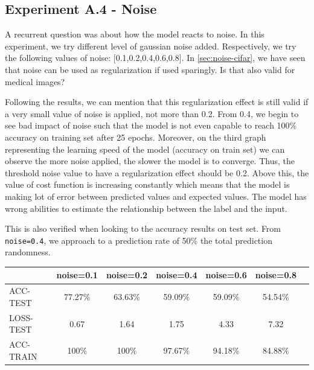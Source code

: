 \documentclass[11pt, openany]{report}
\theoremstyle{plain}
\theoremstyle{definition}
\theoremstyle{remark}
\begin{document}
\newpage
\subsection{Experiment A.4 - Noise} \label{sec:noise-allidb1}

A recurrent question was about how the model reacts to noise. In this experiment, we try different level of gaussian noise added. Respectively, we try the following values of noise: [0.1,0.2,0.4,0.6,0.8]. In \autoref{sec:noise-cifar}, we have seen that noise can be used as regularization if used sparingly. Is that also valid for medical images? 

Following the results, we can mention that this regularization effect is still valid if a very small value of noise is applied, not more than 0.2. From 0.4, we begin to see bad impact of noise such that the model is not even capable to reach 100\% accuracy on training set after 25 epochs. Moreover, on the third graph representing the learning speed of the model (accuracy on train set) we can observe the more noise applied, the slower the model is to converge. Thus, the threshold noise value to have a regularization effect should be 0.2. Above this, the value of cost function is increasing constantly which means that the model is making lot of error between predicted values and expected values. The model has wrong abilities to estimate the relationship between the label and the input. 

This is also verified when looking to the accuracy results on test set. From \texttt{noise=0.4}, we approach to a prediction rate of 50\% the total prediction randomness.    

\begin{center}
\begin{tabular}{|l|c|c|c|c|c|c|}
  \hline
   & \textbf{noise=0.1} & \textbf{noise=0.2} & \textbf{noise=0.4} & \textbf{noise=0.6} & \textbf{noise=0.8}\\
  \hline
  ACC-TEST & 77.27\% & 63.63\% & 59.09\% & 59.09\% & 54.54\%\\
  LOSS-TEST & 0.67 & 1.64 & 1.75 & 4.33  & 7.32\\ 
  ACC-TRAIN & 100\% & 100\% & 97.67\% & 94.18\% & 84.88\% \\ 
  \hline
\end{tabular}
\label{table:results-A4}
\end{center}
\end{document}

